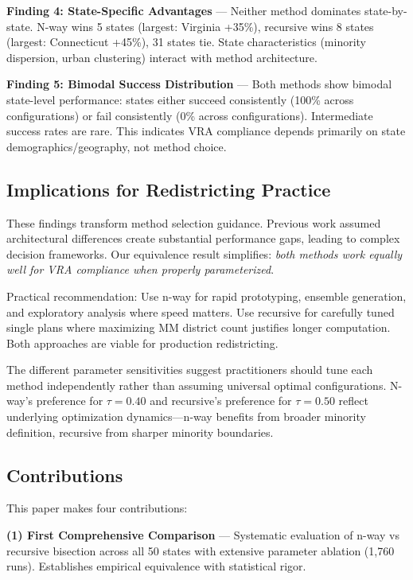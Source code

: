 \textbf{Finding 4: State-Specific Advantages} — Neither method dominates state-by-state. N-way wins 5 states (largest: Virginia +35\%), recursive wins 8 states (largest: Connecticut +45\%), 31 states tie. State characteristics (minority dispersion, urban clustering) interact with method architecture.

\textbf{Finding 5: Bimodal Success Distribution} — Both methods show bimodal state-level performance: states either succeed consistently (100\% across configurations) or fail consistently (0\% across configurations). Intermediate success rates are rare. This indicates VRA compliance depends primarily on state demographics/geography, not method choice.

\subsection{Implications for Redistricting Practice}

These findings transform method selection guidance. Previous work assumed architectural differences create substantial performance gaps, leading to complex decision frameworks. Our equivalence result simplifies: \textit{both methods work equally well for VRA compliance when properly parameterized}.

Practical recommendation: Use n-way for rapid prototyping, ensemble generation, and exploratory analysis where speed matters. Use recursive for carefully tuned single plans where maximizing MM district count justifies longer computation. Both approaches are viable for production redistricting.

The different parameter sensitivities suggest practitioners should tune each method independently rather than assuming universal optimal configurations. N-way's preference for $\tau=0.40$ and recursive's preference for $\tau=0.50$ reflect underlying optimization dynamics—n-way benefits from broader minority definition, recursive from sharper minority boundaries.

\subsection{Contributions}

This paper makes four contributions:

\textbf{(1) First Comprehensive Comparison} — Systematic evaluation of n-way vs recursive bisection across all 50 states with extensive parameter ablation (1,760 runs). Establishes empirical equivalence with statistical rigor.

